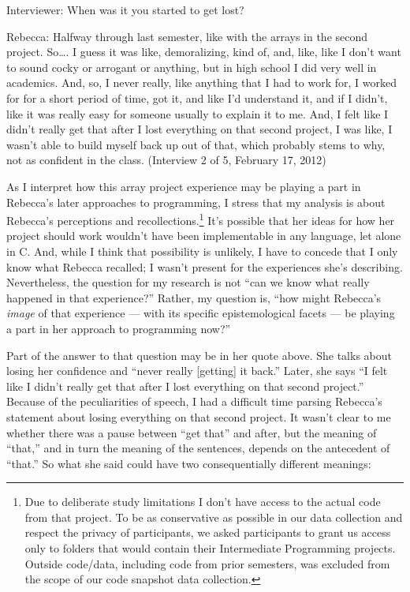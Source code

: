 Interviewer: When was it you started to get lost?

Rebecca: Halfway through last semester, like with the arrays in the
second project. So\ldots{}. I guess it was like, demoralizing, kind of,
and, like, like I don't want to sound cocky or arrogant or anything, but
in high school I did very well in academics. And, so, I never really,
like anything that I had to work for, I worked for for a short period of
time, got it, and like I'd understand it, and if I didn't, like it was
really easy for someone usually to explain it to me. And, I felt like I
didn't really get that after I lost everything on that second project, I
was like, I wasn't able to build myself back up out of that, which
probably stems to why, not as confident in the class. (Interview 2 of 5,
February 17, 2012)

As I interpret how this array project experience may be playing a part
in Rebecca's later approaches to programming, I stress that my analysis
is about Rebecca's perceptions and recollections.\footnote{Due to
  deliberate study limitations I don't have access to the actual code
  from that project. To be as conservative as possible in our data
  collection and respect the privacy of participants, we asked
  participants to grant us access only to folders that would contain
  their Intermediate Programming projects. Outside code/data, including
  code from prior semesters, was excluded from the scope of our code
  snapshot data collection.} It's possible that her ideas for how her
project should work wouldn't have been implementable in any language,
let alone in C. And, while I think that possibility is unlikely, I have
to concede that I only know what Rebecca recalled; I wasn't present for
the experiences she's describing. Nevertheless, the question for my
research is not ``can we know what really happened in that experience?''
Rather, my question is, ``how might Rebecca's \emph{image} of that
experience --- with its specific epistemological facets --- be playing a
part in her approach to programming now?''

Part of the answer to that question may be in her quote above. She talks
about losing her confidence and ``never really {[}getting{]} it back.''
Later, she says ``I felt like I didn't really get that after I lost
everything on that second project.'' Because of the peculiarities of
speech, I had a difficult time parsing Rebecca's statement about losing
everything on that second project. It wasn't clear to me whether there
was a pause between ``get that'' and after, but the meaning of ``that,''
and in turn the meaning of the sentences, depends on the antecedent of
``that.'' So what she said could have two consequentially different
meanings:

